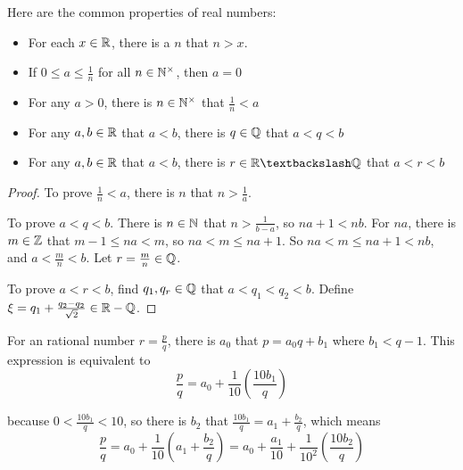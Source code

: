 \begin{theorem}
    Here are the common properties of real numbers:
    \begin{itemize}
        \item For each $x \in \mathbb{R}$, there is a $n$ that $n > x$.
        \item If $\displaystyle 0 \leq a \leq \frac{1}{n}$ for all $n \in \mathbb{N}^{\times}$, then $a = 0$
        \item For any $a >0$, there is $n \in \mathbb{N}^{\times}$ that $\displaystyle \frac{1}{n} < a$
        \item For any $a,b\in \mathbb{R}$ that $a < b$, there is $q \in \mathbb{Q}$ that $a < q < b$
        \item For any $a,b\in \mathbb{R}$ that $a < b$, there is $r \in \realnumber \textbackslash \rational $ that $a < r < b$
    \end{itemize}    
\end{theorem}
\begin{proof}
    To prove $\frac{1}{n} < a$, there is $n$ that $n > \frac{1}{a}$. 
    
    To prove $a < q < b$. There is $n \in \mathbb{N}$ that $n > \frac{1}{b-a}$, so $na + 1 < nb$. For $na$, there is $m \in \mathbb{Z}$ that $m - 1 \leq na < m$, so $na < m \leq na + 1$. So $na < m \leq na + 1 < nb$, and $a < \frac{m}{n} < b$. Let $r = \frac{m}{n} \in \mathbb{Q}$.
    
    To prove $a < r < b$, find $q_1, q_r \in \mathbb{Q}$ that $a < q_1 < q_2 < b$. Define $\xi = q_1 + \frac{q_2 - q_2}{\sqrt{2}} \in \mathbb{R} - \mathbb{Q}$.
\end{proof}


\begin{example}
    For an rational number $r = \frac{p}{q}$, there is $a_0$ that $p = a_0 q + b_1$ where $b_1 < q-1$. This expression is equivalent to 
    \begin{equation}
        \frac{p}{q} = a_0 + \frac{1}{10} \left(\frac{10 b_1}{q} \right)
    \end{equation}
    
    because $0 < \frac{10 b_1}{q} < 10$, so there is $b_2$ that $\frac{10 b_1}{q} = a_1 + \frac{b_2}{q}$, which means
    \begin{equation}
        \frac{p}{q} = a_0 + \frac{1}{10} \left( a_1 + \frac{b_2}{q} \right) = a_0 + \frac{a_1}{10} + \frac{1}{10^2} \left(\frac{10 b_2}{q} \right)
    \end{equation}
\end{example}


